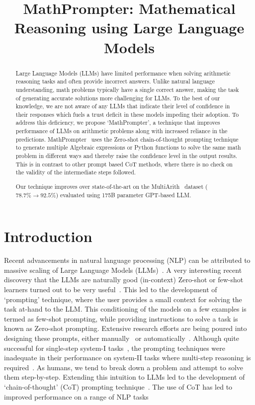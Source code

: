 \title{MathPrompter: Mathematical Reasoning using Large Language Models}

\begin{abstract}
Large Language Models (LLMs) have limited performance when solving arithmetic reasoning tasks and often provide incorrect answers. Unlike natural language understanding, math problems typically have a single correct answer, making the task of generating accurate solutions more challenging for LLMs. To the best of our knowledge, we are not aware of any LLMs that indicate their level of confidence in their responses which fuels a trust deficit in these models impeding their adoption. To address this deficiency, we propose `MathPrompter', a technique that improves performance of LLMs on arithmetic problems along with increased reliance in the predictions. MathPrompter~ uses the Zero-shot chain-of-thought prompting technique to generate multiple Algebraic expressions or Python functions to solve the same math problem in different ways and thereby raise the confidence level in the output results. This is in contrast to other prompt based CoT methods, where there is no check on the validity of the intermediate steps followed. 

Our technique improves over state-of-the-art on the MultiArith~ dataset ($78.7\%\rightarrow92.5\%$) evaluated using 175B parameter GPT-based LLM.
\end{abstract}

\section{Introduction}

Recent advancements in natural language processing (NLP) can be attributed to massive scaling of Large Language Models (LLMs)~\cite{vaswani2017attention,devlin2018bert,raffel2020exploring,brown2020language,rae2021scaling,chowdhery2022palm,thoppilan2022lamda}. A very interesting recent discovery that the LLMs are naturally good (in-context) Zero-shot or few-shot learners turned out to be very useful~\cite{brown2020language,liu2021makes,liu2023pre}. This led to the development of `prompting' technique, where the user provides a small context for solving the task at-hand to the LLM. This conditioning of the models on a few examples is termed as few-shot prompting, while providing instructions to solve a task is known as Zero-shot prompting. Extensive research efforts are being poured into designing these prompts, either manually~\cite{schick2020s,reynolds2021prompt} or automatically~\cite{shin2020autoprompt,gao2020making}. Although quite successful for single-step system-I tasks~\cite{stanovich200024,liu2023pre}, the prompting techniques were inadequate in their performance on system-II tasks where multi-step reasoning is required~\cite{rae2021scaling}. As humans, we tend to break down a problem and attempt to solve them step-by-step. Extending this intuition to LLMs led to the development of `chain-of-thought' (CoT) prompting technique~\cite{wei2022chain,wang2022self}. The use of CoT has led to improved performance on a range of NLP tasks~\cite{talmor2018commonsenseqa,gao2020making,patel2021nlp,cobbe2021training,geva2021did,chowdhery2022palm,srivastava2022beyond}

